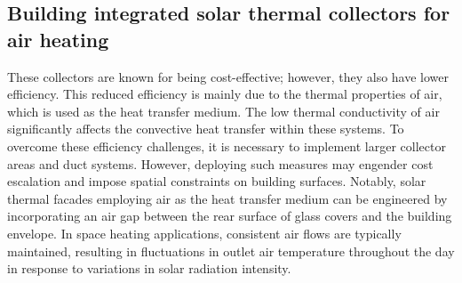 %
%
%
\subsection{Building integrated solar thermal collectors for air heating}

These collectors are known for being cost-effective; however, they also have lower efficiency. This reduced efficiency is mainly due to the thermal properties of air, which is used as the heat transfer medium. The low thermal conductivity of air significantly affects the convective heat transfer within these systems. To overcome these efficiency challenges, it is necessary to implement larger collector areas and duct systems. However, deploying such measures may engender cost escalation and impose spatial constraints on building surfaces. Notably, solar thermal facades employing air as the heat transfer medium can be engineered by incorporating an air gap between the rear surface of glass covers and the building envelope. In space heating applications, consistent air flows are typically maintained, resulting in fluctuations in outlet air temperature throughout the day in response to variations in solar radiation intensity.



